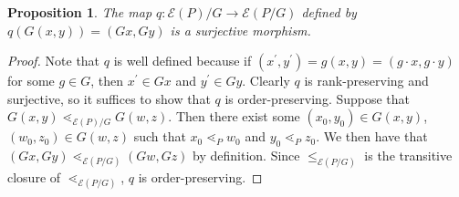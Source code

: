 \documentclass[10 pt]{amsart}
\theoremstyle{plain}
\newtheorem{prop}[thm]{Proposition}
\theoremstyle{definition}
\theoremstyle{remark}
\numberwithin{equation}{section}
\newcommand\rk{\operatorname{rk}}
\begin{document}
\begin{prop}\label{prop:surjection_between_F_quotients}
The map $q\colon \mathcal E(P)/G\rightarrow \mathcal E(P/G)$ defined by $q(G(x, y)) = (Gx,Gy)$ is a surjective morphism.
\end{prop}

\begin{proof}



Note that $q$ is well defined because if $(x^\prime, y^\prime) = g(x, y) = (g\cdot x, g\cdot y)$ for some $g\in G$, then $x^\prime\in Gx$ and $y^\prime\in Gy$.  Clearly $q$ is rank-preserving and surjective, so it suffices to show that $q$ is order-preserving.  Suppose that $G(x, y) \lessdot_{\mathcal E(P)/G} G(w, z)$.  Then there exist some $(x_0, y_0)\in G(x, y)$, $(w_0, z_0)\in G(w, z)$ such that $x_0\lessdot_P w_0$ and $y_0\lessdot_P z_0$.  We then have that $(Gx, Gy) \lessdot_{\mathcal E(P/G)} (Gw, Gz)$ by definition. Since $\le_{\mathcal E(P/G)}$ is the transitive closure of $\lessdot_{\mathcal E(P/G)}$, $q$ is order-preserving.
\end{proof}
\end{document}
